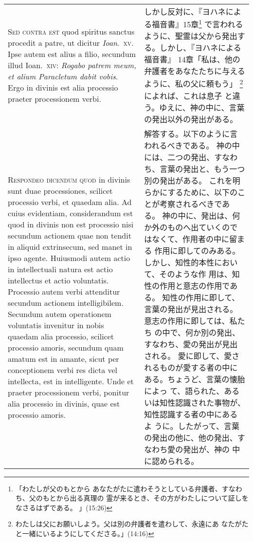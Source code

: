 \documentclass[10pt]{jsarticle} %
\begin{document}
\begin{longtable}{p{21em}p{21em}}
\\



{\scshape Sed contra est} quod spiritus sanctus procedit a patre, ut dicitur
{\itshape Ioan}.~{\scshape xv}. Ipse autem est alius a filio, secundum illud Ioan.~{\scshape xiv}: {\itshape Rogabo
patrem meum, et alium Paracletum dabit vobis}. Ergo in divinis est alia
processio praeter processionem verbi.


&

しかし反対に、『ヨハネによる福音書』15章\footnote{「わたしが父のもとから
 あなたがたに遣わそうとしている弁護者、すなわち、父のもとから出る真理の
 霊が来るとき、その方がわたしについて証しをなさるはずである。 」(15:26)}
 で言われるように、聖霊は父から発出する。しかし、『ヨハネによる福音書』
 14章「私は、他の弁護者をあなたたちに与えるように、私の父に頼もう」
 \footnote{わたしは父にお願いしよう。父は別の弁護者を遣わして、永遠にあ
 なたがたと一緒にいるようにしてくださる。」(14:16) }によれば、これは息子
 と違う。ゆえに、神の中に、言葉の発出以外の発出がある。

\\



{\scshape Respondeo dicendum quod} in divinis sunt duae processiones, scilicet
processio verbi, et quaedam alia. Ad cuius evidentiam, considerandum est
quod in divinis non est processio nisi secundum actionem quae non tendit
in aliquid extrinsecum, sed manet in ipso agente. Huiusmodi autem actio
in intellectuali natura est actio intellectus et actio
voluntatis. Processio autem verbi attenditur secundum actionem
intelligibilem. Secundum autem operationem voluntatis invenitur in nobis
quaedam alia processio, scilicet processio amoris, secundum quam amatum
est in amante, sicut per conceptionem verbi res dicta vel intellecta,
est in intelligente. Unde et praeter processionem verbi, ponitur alia
processio in divinis, quae est processio amoris.


&


解答する。以下のように言われるべきである。
神の中には、二つの発出、すなわち、言葉の発出と、もう一つ別の発出がある。
これを明らかにするために、以下のことが考察されるべきである。
神の中に、発出は、何か外のものへ出ていくのではなくて、作用者の中に留まる
 作用に即してのみある。しかし、知性的本性において、そのような作
 用は、知性の作用と意志の作用である。
知性の作用に即して、言葉の発出が見出される。意志の作用に即しては、私たち
 の中で、何か別の発出、すなわち、愛の発出が見出される。
愛に即して、愛されるものが愛する者の中にある。ちょうど、言葉の懐胎によっ
 て、語られた、あるいは知性認識された事物が、知性認識する者の中にあるよ
 うに。したがって、言葉の発出の他に、他の発出、すなわち愛の発出が、神の
 中に認められる。



\end{longtable}
\end{document}
